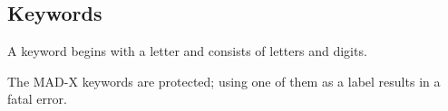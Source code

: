 

\subsection{Keywords}
\label{subsec:keyword}

A keyword begins with a letter and consists of letters and digits. 

The MAD-X keywords are protected; using one of them as a label results
in a fatal error.   


